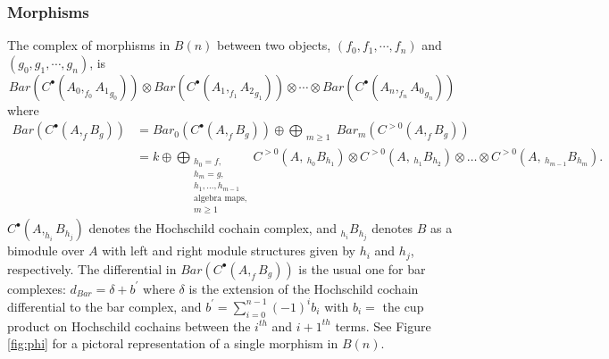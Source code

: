 \subsubsection{Morphisms}
The complex of morphisms in $B(n)$ between two objects, 
$(f_0, f_1, \cdots, f_n)$ and $(g_0, g_1, \cdots, g_n)$, is 
%
\begin{equation*}
Bar(C^\bullet(A_0, _{f_0}{A_1}_{g_0})) \otimes Bar(C^\bullet(A_1, _{f_1}{A_2}_{g_1})) \otimes \cdots
\otimes Bar(C^\bullet(A_n, _{f_n}{A_0}_{g_n}))
\end{equation*}
%
where 
%
\begin{align*}
Bar(C^\bullet(A, _fB_g)) 
&= Bar_0(C^\bullet(A, _fB_g)) \oplus 
  \bigoplus_{\substack{m \geq 1}} 
    Bar_m(C^{>0}(A, _fB_g)) \\
&= k \oplus 
  \bigoplus_{\substack{
  h_0 = f, \\
  h_m = g, \\
  h_1, \dots, h_{m-1}\\ 
	\textrm{algebra maps}, \\
	m \geq 1}} 
  C^{>0}(A, \, _{h_0}B_{h_1}) \otimes 
  C^{>0}(A, \, _{h_1}B_{h_2}) 
  \otimes \dots \otimes 
  C^{>0}(A, \, _{h_{m-1}}B_{h_m}).
\end{align*}
%
$C^\bullet(A, _{h_i}B_{h_j})$ denotes the Hochschild cochain complex, and
$_{h_i}B_{h_j}$ denotes $B$ as a bimodule over $A$ with left and right module structures 
given by $h_i$ and $h_j$, respectively. 
The differential in $Bar(C^\bullet(A, _fB_g))$  is the usual one for bar complexes: 
$d_{Bar} = \delta + b^\prime$ where 
$\delta$ is the extension of the Hochschild cochain differential to the bar complex, 
and $b^\prime = \sum_{i=0}^{n-1} (-1)^{i}b_i$ with
$b_i =$ the cup product on Hochschild cochains between the $i^{th}$ and $i+1^{th}$ terms.
See Figure \ref{fig:phi} for a pictoral representation of a single morphism in $B(n)$.
%
